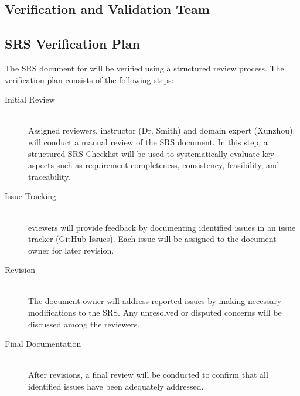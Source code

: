 \documentclass[12pt, titlepage]{article}
\begin{document}
\subsection{Verification and Validation Team} \label{3.1}
\begin{center}
\begin{table}[h]
\caption{Verification and validation team}
\label{vnvteam}
\end{table}
\end{center}

\subsection{SRS Verification Plan} \label{3.2}
The SRS document for \progname will be verified using a structured review
process. The verification plan consists of the following steps:
\begin{description}
\item[Initial Review] \hfill \\
  Assigned reviewers, instructor (Dr. Smith) and domain expert
  (Xunzhou). will conduct a manual review of the SRS document. In this step, a
  structured
  \href{https://github.com/smiths/capTemplate/blob/9251702fdcb9800c59f6ed3d11d91e2bd62fca6d/docs/Checklists/SRS-Checklist.pdf}{SRS
    Checklist} will be used to systematically evaluate key aspects such as
  requirement completeness, consistency, feasibility, and traceability.
\item[Issue Tracking] \hfill \\
  eviewers will provide feedback by documenting identified issues in an issue
  tracker (GitHub Issues). Each issue will be
  assigned to the document owner for later revision.
\item[Revision] \hfill \\
  The document owner will address reported issues by making necessary
  modifications to the SRS. Any unresolved or disputed concerns will be
  discussed among the reviewers.
\item[Final Documentation] \hfill \\
  After revisions, a final review will be conducted to confirm that all
  identified issues have been adequately addressed.
\end{description}
\end{document}
